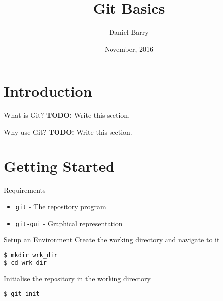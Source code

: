 \documentclass{beamer}
\title{Git Basics}
\date{November, 2016}
\author{Daniel Barry}
\institute{University of Hertfordshire}
\begin{document}
  \maketitle
  \section{Introduction}
  \begin{frame}{What is Git?}
    \textbf{TODO:} Write this section.
  \end{frame}
  \begin{frame}{Why use Git?}
    \textbf{TODO:} Write this section.
  \end{frame}
  \section{Getting Started}
  \begin{frame}{Requirements}
    \begin{itemize}
      \item \texttt{git} - The repository program
      \item \texttt{git-gui} - Graphical representation
    \end{itemize}
  \end{frame}
  \begin{frame}[fragile=singleslide]{Setup an Environment}
    Create the working directory and navigate to it
    \begin{lstlisting}[language=bash]
$ mkdir wrk_dir
$ cd wrk_dir
    \end{lstlisting}
    Initialise the repository in the working directory
    \begin{lstlisting}[language=bash]
$ git init
    \end{lstlisting}
  \end{frame}
\end{document}
